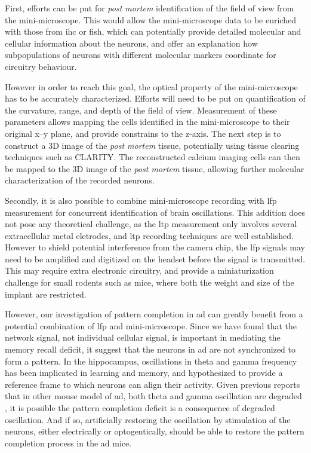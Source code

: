 First, efforts can be put for \textit{post mortem} identification of the field of view from the mini-microscope. This would allow the mini-microscope data to be enriched with those from \gls{ihc} or \gls{fish}, which can potentially provide detailed molecular and cellular information about the neurons, and offer an explanation how subpopulations of neurons with different molecular markers coordinate for circuitry behaviour. 

However in order to reach this goal, the optical property of the mini-microscope has to be accurately characterized. Efforts will need to be put on quantification of the curvature, range, and depth of the field of view. Measurement of these parameters allows mapping the cells identified in the mini-microscope to their original x--y plane, and provide constrains to the z-axis. The next step is to construct a 3D image of the \textit{post mortem} tissue, potentially using tissue clearing techniques such as CLARITY. The reconstructed calcium imaging cells can then be mapped to the 3D image of the \textit{post mortem} tissue, allowing further molecular characterization of the recorded neurons. 

Secondly, it is also possible to combine mini-microscope recording with \gls{lfp} measurement for concurrent identification of brain oscillations. This addition does not pose any theoretical challenge, as the \gls{ltp} measurement only involves several extracellular metal eletrodes, and \gls{ltp} recording techniques are well established. However to shield potential interference from the camera chip, the \gls{lfp} signals may need to be amplified and digitized on the headset before the signal is transmitted. This may require extra electronic circuitry, and provide a miniaturization challenge for small rodents such as mice, where both the weight and size of the implant are restricted. 

However, our investigation of pattern completion in \gls{ad} can greatly benefit from a potential combination of \gls{lfp} and mini-microscope. Since we have found that the network signal, not individual cellular signal, is important in mediating the memory recall deficit, it suggest that the neurons in \gls{ad} are not synchronized to form a pattern. In the hippocampus, oscillations in theta and gamma frequency has been implicated in learning and memory, and hypothesized to provide a reference frame to which neurons can align their activity. Given previous reports that in other mouse model of \gls{ad}, both theta and gamma oscillation are degraded , it is possible the pattern completion deficit is a consequence of degraded oscillation. And if so, artificially restoring the oscillation by stimulation of the neurons, either electrically or optogentically, should be able to restore the pattern completion process in the \gls{ad} mice. 


